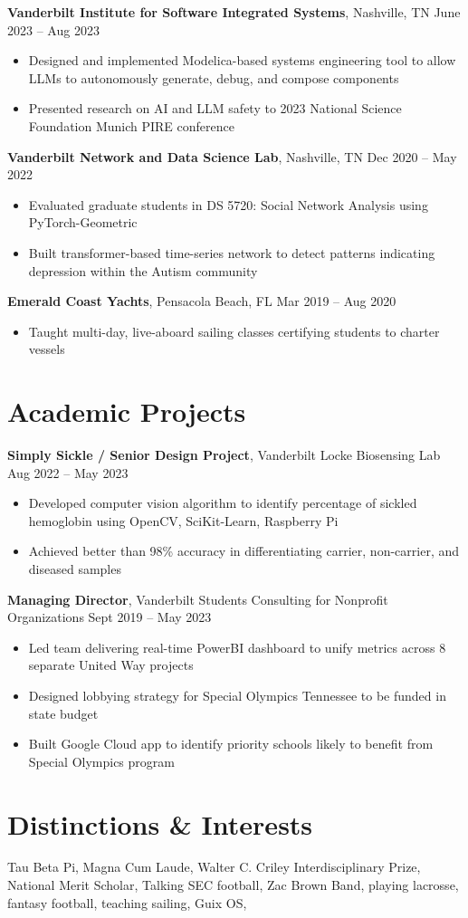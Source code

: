 \documentclass[10.5pt]{article}
\newcommand{\postlinebreakspacing} {
  \vspace{0.4ex}
}
\newcommand{\roleheader}[3]{
  \postlinebreakspacing
  \textbf{#1}, #2 \hfill #3
}
\newcommand{\itemizedrole}[5]{
  \roleheader{#1}{#2}{#3 -- #4}

  \begin{itemize}
    #5
  \end{itemize}
}
\begin{document}
\itemizedrole
{Vanderbilt Institute for Software Integrated Systems}
{Nashville, TN}
{June 2023}
{Aug 2023}
{

	\item Designed and implemented Modelica-based systems engineering tool to allow LLMs to autonomously generate, debug, and compose components
	\item Presented research on AI and LLM safety to 2023 National Science Foundation Munich PIRE conference
}

\itemizedrole
{Vanderbilt Network and Data Science Lab}
{Nashville, TN}
{Dec 2020}
{May 2022}
{

	\item Evaluated graduate students in DS 5720: Social Network Analysis using PyTorch-Geometric
	\item Built transformer-based time-series network to detect patterns indicating depression within the Autism community
}

\itemizedrole
{Emerald Coast Yachts}
{Pensacola Beach, FL}
{Mar 2019}
{Aug 2020}
{
	\item Taught multi-day, live-aboard sailing classes certifying students to charter vessels
}


\section*{Academic Projects}
\itemizedrole
{Simply Sickle / Senior Design Project}
{Vanderbilt Locke Biosensing Lab}
{Aug 2022}
{May 2023}
{
	\item Developed computer vision algorithm to identify percentage of sickled hemoglobin using OpenCV, SciKit-Learn, Raspberry Pi
	\item Achieved better than 98\% accuracy in differentiating carrier, non-carrier, and diseased samples
}

\itemizedrole
{Managing Director}
{Vanderbilt Students Consulting for Nonprofit Organizations}
{Sept 2019}
{May 2023}
{
	\item Led team delivering real-time PowerBI dashboard to unify metrics across 8 separate United Way projects
	\item Designed lobbying strategy for Special Olympics Tennessee to be funded in state budget
	\item Built Google Cloud app to identify priority schools likely to benefit from Special Olympics program
}


\section*{Distinctions \& Interests}
\lines
{
	 {Tau Beta Pi, Magna Cum Laude, Walter C. Criley Interdisciplinary Prize, National Merit Scholar},
	 {Talking SEC football, Zac Brown Band, playing lacrosse, fantasy football, teaching sailing, Guix OS},
}
\end{document}
